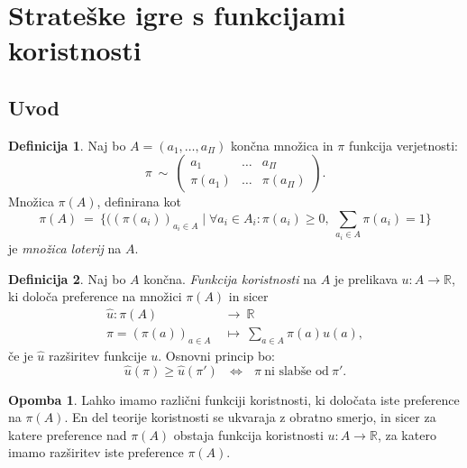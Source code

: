 \documentclass[11pt]{article}
\newcommand{\R}{\mathbb{R}}
\newcommand{\set}[1]{\{#1\}}
\theoremstyle{definition}
\newtheorem{definicija}{Definicija}[section]
\theoremstyle{definition}
\theoremstyle{definition}
\theoremstyle{definition}
\newtheorem*{opomba}{Opomba}
\begin{document}
\pagebreak


\section{Strateške igre s funkcijami koristnosti}
\vspace{0.5cm}


\subsection{Uvod}
\vspace{0.5cm}

\begin{definicija}

Naj bo $A = (a_1,\ldots,a_\Pi)$ končna množica in $\pi$ funkcija verjetnosti:
$$\pi ~\sim~ \begin{pmatrix}
a_1 & \ldots & a_\Pi \\
\pi(a_1) & \ldots & \pi(a_\Pi)
\end{pmatrix}.$$ 
Množica $\pi(A)$, definirana kot
$$\pi(A) ~=~ \set{((\pi(a_i))_{a_i \in A} \mid \forall a_i \in A_i: \pi(a_i) \geq 0, ~\sum_{a_i \in A} \pi(a_i) = 1}$$
je \textit{množica loterij} na $A$.

\end{definicija}
\vspace{0.5cm}

\begin{definicija}

Naj bo $A$ končna. \textit{Funkcija koristnosti} na $A$ je prelikava $u: A \rightarrow \R$, ki določa preference na množici $\pi(A)$ in sicer
\begin{align*}
\hat{u}: \pi(A) ~&\rightarrow~ \R \\
\pi = (\pi(a))_{a \in A} ~&\mapsto~ \sum_{a \in A} \pi(a) u(a),
\end{align*}
če je $\hat{u}$ razširitev funkcije $u$. Osnovni princip bo:
$$\hat{u}(\pi) \geq \hat{u}(\pi') ~~~\iff~~~ \pi ~\text{ni slabše od}~ \pi'.$$

\end{definicija}
\vspace{0.5cm}

\begin{opomba}

Lahko imamo različni funkciji koristnosti, ki določata iste preference na $\pi(A)$. En del teorije koristnosti se ukvaraja z obratno smerjo, in sicer za katere preference nad $\pi(A)$ obstaja funkcija koristnosti $u: A \rightarrow \R$, za katero imamo razširitev iste preference $\pi(A)$.

\end{opomba}
\vspace{0.5cm}
\end{document}
